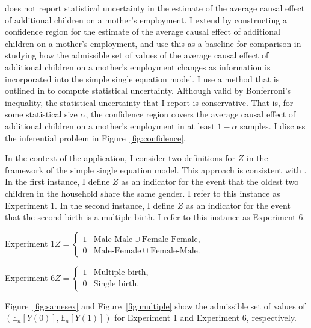 \documentclass[10pt,a4paper,twoside]{article}
\numberwithin{equation}{section}
\begin{document}
\cite{cr13} does not report statistical uncertainty in the estimate of the average causal effect of additional children on a mother's employment. I extend \cite{cr13} by constructing a confidence region for the estimate of the average causal effect of additional children on a mother's employment, and use this as a baseline for comparison in studying how the admissible set of values of the average causal effect of additional children on a mother's employment changes as information is incorporated into the simple single equation model. I use a method that is outlined in \cite{cHlr13} to compute statistical uncertainty. Although valid by Bonferroni's inequality, the statistical uncertainty that I report is conservative. That is, for some statistical size $\alpha$, the confidence region covers the average causal effect of additional children on a mother's employment in at least $1-\alpha$ samples. I discuss the inferential problem in Figure~\ref{fig:confidence}.

In the context of the application, I consider two definitions for $Z$ in the framework of the simple single equation model. This approach is consistent with \cite{cr13}. In the first instance, I define $Z$ as an indicator for the event that the oldest two children in the household share the same gender. I refer to this instance as Experiment 1. In the second instance, I define $Z$ as an indicator for the event that the second birth is a multiple birth. I refer to this instance as Experiment 6.
 
\noindent Experiment 1\hspace{10pt}$Z=\begin{cases}
1 &\text{Male-Male}\cup\text{Female-Female},\\
0 &\text{Male-Female}\cup\text{Female-Male}.
\end{cases}$

\noindent Experiment 6\hspace{10pt}$Z=\begin{cases}
1 &\text{Multiple birth},\\
0 &\text{Single birth}.
\end{cases}$

\noindent Figure~\ref{fig:samesex} and Figure~\ref{fig:multiple} show the admissible set of values of $(\mathbb{E}_n[Y(0)],\mathbb{E}_n[Y(1)])$ for Experiment 1 and Experiment 6, respectively. 
\end{document}
